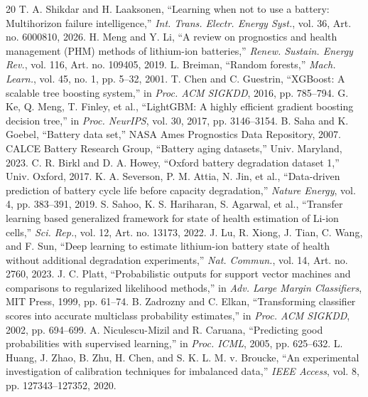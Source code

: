 \documentclass[journal]{IEEEtran}
\begin{document}
\begin{thebibliography}{20}
 T. A. Shikdar and H. Laaksonen, ``Learning when not to use a battery: Multihorizon failure intelligence,'' \emph{Int. Trans. Electr. Energy Syst.}, vol. 36, Art. no. 6000810, 2026.
 H. Meng and Y. Li, ``A review on prognostics and health management (PHM) methods of lithium-ion batteries,'' \emph{Renew. Sustain. Energy Rev.}, vol. 116, Art. no. 109405, 2019.
 L. Breiman, ``Random forests,'' \emph{Mach. Learn.}, vol. 45, no. 1, pp. 5--32, 2001.
 T. Chen and C. Guestrin, ``XGBoost: A scalable tree boosting system,'' in \emph{Proc. ACM SIGKDD}, 2016, pp. 785--794.
 G. Ke, Q. Meng, T. Finley, et al., ``LightGBM: A highly efficient gradient boosting decision tree,'' in \emph{Proc. NeurIPS}, vol. 30, 2017, pp. 3146--3154.
 B. Saha and K. Goebel, ``Battery data set,'' NASA Ames Prognostics Data Repository, 2007.
 CALCE Battery Research Group, ``Battery aging datasets,'' Univ. Maryland, 2023.
 C. R. Birkl and D. A. Howey, ``Oxford battery degradation dataset 1,'' Univ. Oxford, 2017.
 K. A. Severson, P. M. Attia, N. Jin, et al., ``Data-driven prediction of battery cycle life before capacity degradation,'' \emph{Nature Energy}, vol. 4, pp. 383--391, 2019.
 S. Sahoo, K. S. Hariharan, S. Agarwal, et al., ``Transfer learning based generalized framework for state of health estimation of Li-ion cells,'' \emph{Sci. Rep.}, vol. 12, Art. no. 13173, 2022.
 J. Lu, R. Xiong, J. Tian, C. Wang, and F. Sun, ``Deep learning to estimate lithium-ion battery state of health without additional degradation experiments,'' \emph{Nat. Commun.}, vol. 14, Art. no. 2760, 2023.
 J. C. Platt, ``Probabilistic outputs for support vector machines and comparisons to regularized likelihood methods,'' in \emph{Adv. Large Margin Classifiers}, MIT Press, 1999, pp. 61--74.
 B. Zadrozny and C. Elkan, ``Transforming classifier scores into accurate multiclass probability estimates,'' in \emph{Proc. ACM SIGKDD}, 2002, pp. 694--699.
 A. Niculescu-Mizil and R. Caruana, ``Predicting good probabilities with supervised learning,'' in \emph{Proc. ICML}, 2005, pp. 625--632.
 L. Huang, J. Zhao, B. Zhu, H. Chen, and S. K. L. M. v. Broucke, ``An experimental investigation of calibration techniques for imbalanced data,'' \emph{IEEE Access}, vol. 8, pp. 127343--127352, 2020.

\end{thebibliography}
\end{document}
